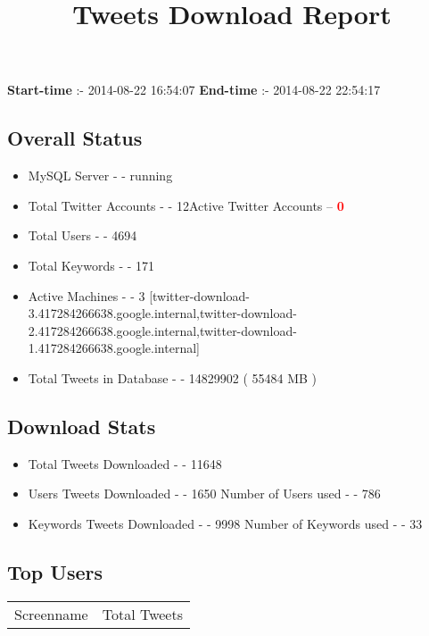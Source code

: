 \documentclass{article}\usepackage[T1]{fontenc}
\begin{document}
\title{\textbf{Tweets Download Report}}
               \date{}
                \maketitle
               \centerline{\textbf{Start-time} :- 2014-08-22 16:54:07 \hspace{40pt} \textbf{End-time} :- 2014-08-22 22:54:17}               \subsection*{Overall Status}                \begin{itemize}                \item MySQL Server - - running               \item Total Twitter Accounts - - 12\newline Active Twitter Accounts -- \textcolor{red}{\textbf{0}}               \item Total Users - - 4694               \item Total Keywords - - 171               \item Active Machines - - 3 [twitter-download-3.417284266638.google.internal,twitter-download-2.417284266638.google.internal,twitter-download-1.417284266638.google.internal]               \item Total Tweets in Database - - 14829902 ( 55484 MB )               \end{itemize}               \subsection*{Download Stats}                \begin{itemize}                \item Total Tweets Downloaded - - 11648               \item Users Tweets Downloaded - - 1650 \newline Number of Users used - - 786               \item Keywords Tweets Downloaded - - 9998 \newline Number of Keywords used - - 33              \end{itemize}              \subsection*{Top Users}\begin{tabular}{|c|c|}         \hline         Screenname & Total Tweets \\ 

\end{tabular}
\end{document}

